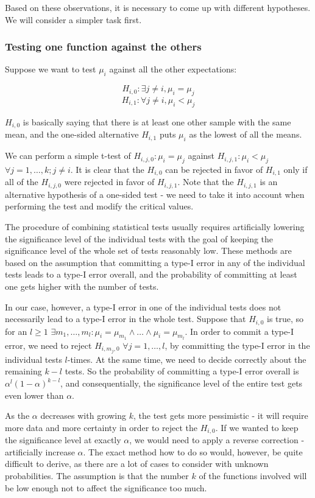 Based on these observations, it is necessary to come up with different hypotheses. We will consider a simpler task first.

\subsubsection{Testing one function against the others}

Suppose we want to test $\mu_i$ against all the other expectations:

\[
H_{i,0}: \exists j \neq i,  \mu_i = \mu_j
\]
\[
H_{i,1}: \forall j \neq i,  \mu_i < \mu_j
\]

$H_{i,0}$ is basically saying that there is at least one other sample with the same mean, and the one-sided alternative $H_{i,1}$ puts $\mu_i$ as the lowest of all the means.

We can perform a simple t-test of $H_{i,j,0}: \mu_i = \mu_j$ against $H_{i,j,1}: \mu_i < \mu_j$ $\forall j = 1, \dots, k; j \neq i$. It is clear that the $H_{i,0}$ can be rejected in favor of $H_{i,1}$ only if all of the $H_{i,j,0}$ were rejected in favor of $H_{i,j,1}$. Note that the $H_{i,j,1}$ is an alternative hypothesis of a one-sided test - we need to take it into account when performing the test and modify the critical values.

The procedure of combining statistical tests usually requires artificially lowering the significance level of the individual tests with the goal of keeping the significance level of the whole set of tests reasonably low. These methods are based on the assumption that committing a type-I error in any of the individual tests leads to a type-I error overall, and the probability of committing at least one gets higher with the number of tests.

In our case, however, a type-I error in one of the individual tests does not necessarily lead to a type-I error in the whole test. Suppose that $H_{i,0}$ is true, so for an $l \geq 1$ $\exists m_1,\dots,m_l: \mu_i = \mu_{m_1} \wedge \dots \wedge \mu_i = \mu_{m_l}$. In order to commit a type-I error, we need to reject $H_{i,m_j,0}$ $\forall j = 1, \dots, l$, by committing the type-I error in the individual tests $l$-times. At the same time, we need to decide correctly about the remaining $k-l$ tests. So the probability of committing a type-I error overall is $\alpha^l(1-\alpha)^{k-l}$, and consequentially, the significance level of the entire test gets even lower than $\alpha$.

As the $\alpha$ decreases with growing $k$, the test gets more pessimistic - it will require more data and more certainty in order to reject the $H_{i,0}$. If we wanted to keep the significance level at exactly $\alpha$, we would need to apply a reverse correction - artificially increase $\alpha$. The exact method how to do so would, however, be quite difficult to derive, as there are a lot of cases to consider with unknown probabilities. The assumption is that the number $k$ of the functions involved will be low enough not to affect the significance too much. 


